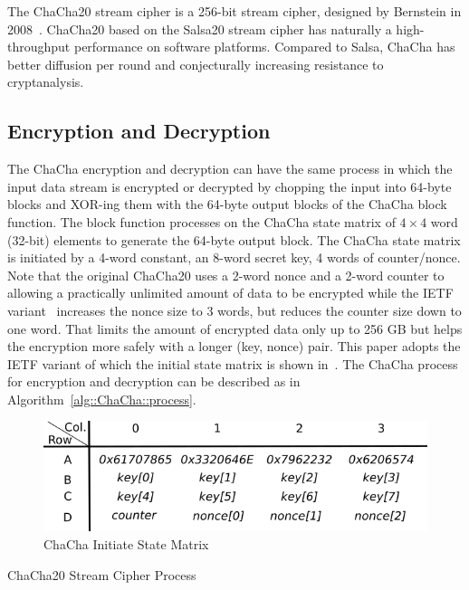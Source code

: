 The ChaCha20 stream cipher is a 256-bit stream cipher, designed by Bernstein in 2008~\cite{Ber:08}.
ChaCha20 based on the Salsa20 stream cipher has naturally a high-throughput performance on software platforms.
Compared to Salsa, ChaCha has better diffusion per round and conjecturally increasing resistance to cryptanalysis. 

\subsection{Encryption and Decryption}
The ChaCha encryption and decryption can have the same process in which the input data stream is encrypted or decrypted by chopping the input into 64-byte blocks and XOR-ing them with the 64-byte output blocks of the ChaCha block function. The block function processes on the ChaCha state matrix of $4\times4$ word (32-bit) elements to generate the 64-byte output block.
The ChaCha state matrix is initiated by a 4-word constant, an 8-word secret key, 4 words of counter/nonce. 
Note that the original ChaCha20 uses a 2-word nonce and a 2-word counter to allowing a practically unlimited amount of data to be encrypted while the IETF variant~\cite{NirLan:18} increases the nonce size to 3 words, but reduces the counter size down to one word.
That limits the amount of encrypted data only up to 256 GB but helps the encryption more safely with a longer (key, nonce) pair. 
This paper adopts the IETF variant of which the initial state matrix is shown in~.
The ChaCha process for encryption and decryption can be described as in Algorithm~\ref{alg::ChaCha::process}.

\begin{figure}
	\centering
	\includegraphics[scale=0.5]{figures/ChaChaState.png}
	\caption{ChaCha Initiate State Matrix}
	\label{fig:bg:ChaChaMatix}
\end{figure}

\begin{algorithm}
	\BlankLine
	\caption{ChaCha20 Stream Cipher Process}
	\label{alg::ChaCha::process}
\end{algorithm}

